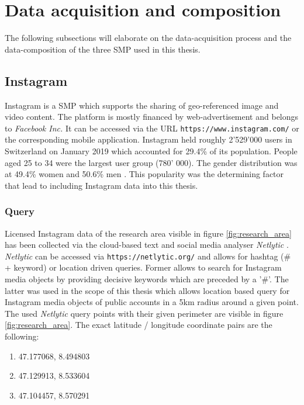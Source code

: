 \section{Data acquisition and composition} \label{data_acquisition}
The following subsections will elaborate on the data-acquisition process and the data-composition of the three SMP used in this thesis. 

\subsection{Instagram} \label{instagram}
Instagram is a SMP which supports the sharing of geo-referenced image and video content. The platform is mostly financed by web-advertisement and belongs to \textit{Facebook Inc.} It can be accessed via the URL \texttt{https://www.instagram.com/} or the corresponding mobile application.
Instagram held roughly 2'529'000 users in Switzerland on January 2019 which accounted for 29.4\% of its population. People aged 25 to 34 were the largest user group (780' 000). The gender distribution was at 49.4\% women and 50.6\% men \parencite{2013}. This popularity was the determining factor that lead to including Instagram data into this thesis.\\

\subsubsection{Query} \label{netlytic}
Licensed Instagram data of the research area visible in figure \ref{fig:research_area} has been collected via the cloud-based text and social media analyser \textit{Netlytic} \parencite{Gruzd2016}. \textit{Netlytic} can be accessed via \texttt{https://netlytic.org/} and allows for hashtag (\# + keyword) or location driven queries. Former allows to search for Instagram media objects by providing decisive keywords which are preceded by a '\#'. The latter was used in the scope of this thesis which allows location based query for Instagram media objects of public accounts in a 5km radius around a given point. The used \textit{Netlytic} query points with their given perimeter are visible in figure \ref{fig:research_area}. The exact latitude / longitude coordinate pairs are the following:\\
\begin{enumerate}
  \item 47.177068, 8.494803
  \item 47.129913, 8.533604
  \item 47.104457, 8.570291
\end{enumerate}


